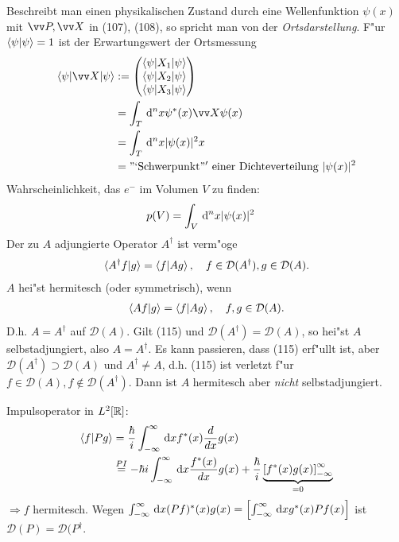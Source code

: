 \documentclass[a4paper]{scrartcl}
\newcommand{\RR}{\ensuremath \mathbb{R}}
\newcommand{\dd}{\ensuremath \, \mathrm{d}}
\newcommand{\matr}[1]{\begin{pmatrix} #1 \end{pmatrix}}
\begin{document}
{Beschreibt man einen physikalischen Zustand durch eine Wellenfunktion $\psi(x)$ mit $\vv P, \vv X$ in (107), (108), so spricht man von der \emph{Ortsdarstellung}. F"ur $\braket{ \psi | \psi} = 1$ ist der Erwartungswert der Ortsmessung
\begin{align}
\begin{split}
\braket{ \psi | \vv X | \psi} & := \matr{  \braket{ \psi |  X_1 | \psi} \\ \braket{ \psi |  X_2 | \psi} \\ \braket{ \psi |  X_3 | \psi} } \\
& = \int_T \dd^nx \psi^*(x) \vv X \psi(x) \\
& = \int_T \dd^n x \vert \psi(x) \vert^2 x \\
& = \mathrm{"`Schwerpunkt"' \ einer \ Dichteverteilung \ } \vert \psi(x) \vert^2
\end{split}
\end{align}
Wahrscheinlichkeit, das $e^-$ im Volumen $V$ zu finden:
\begin{align}
p(V) & = \int_V \dd^nx \vert \psi(x) \vert^2
\end{align}
Der zu $A$ adjungierte Operator $A^\dagger$ ist verm"oge
\begin{align}
\braket{ A^\dagger f | g} = \braket{ f | Ag}, \quad f \in \mathcal D(A^\dagger), g \in \mathcal D(A).
\end{align}
$A$ hei"st hermitesch (oder symmetrisch), wenn 
\begin{align}
\braket{ Af | g} = \braket{ f  | Ag }, \quad f,g \in \mathcal D(A).
\end{align}
D.h. $A = A^\dagger$ auf $\mathcal D(A)$. Gilt (115) und $\mathcal D(A^\dagger) = \mathcal D(A)$, so hei"st $A$ selbstadjungiert, also $A = A^\dagger$. Es kann passieren, dass (115) erf"ullt ist, aber $\mathcal D(A^\dagger) \supset \mathcal D(A)$ und $A^\dagger \neq A$, d.h. (115) ist verletzt f"ur $f \in \mathcal D(A), f \notin \mathcal D(A^\dagger)$. Dann ist $A$ hermitesch aber \emph{nicht} selbstadjungiert.

Impulsoperator in $L^2[\RR]$:
\begin{align*}
\braket{ f | Pg} & = \frac \hbar i \int_{-\infty}^\infty \dd x f^*(x) \frac d {dx} g(x) \\
& \stackrel {PI}= -\hbar i \int_{-\infty}^\infty \dd x \frac{ f^*(x)}{dx} g(x) + \frac \hbar i \underbrace{\left[ f^*(x) g(x) \right]_{-\infty}^\infty}_{=0}
\end{align*}
$\Longrightarrow f$ hermitesch. Wegen $\int_{-\infty}^\infty \dd x (Pf)^*(x) g(x) = \left[ \int_{-\infty}^\infty \dd x g^*(x) Pf(x) \right]$ ist $\mathcal D(P) = \mathcal D(P^\dagger$.

}
\end{document}
